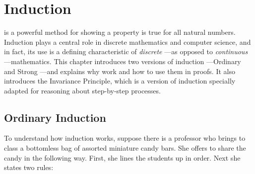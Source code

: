 \chapter{Induction}\label{induction_chap}

 is a powerful method for showing a property is true
for all natural numbers.  Induction plays a central role in discrete
mathematics and computer science, and in fact, its use is a defining
characteristic of \emph{discrete} ---as opposed to \emph{continuous}
---mathematics.  This chapter introduces two versions of induction
---Ordinary and Strong ---and explains why work and how to use them in
proofs.  It also introduces the Invariance Principle, which is a
version of induction specially adapted for reasoning about
step-by-step processes.


\iffalse
we'll introduce induction and a variant called \term{strong
induction}.  Although these two version of methods look and feel
different, it turns out that they are equivalent in the sense that a
proof using any one of the methods can be automatically reformatted so
that it becomes a proof using any of the other methods.  The choice of
which method to use is up to you and typically depends on whichever
seems to be the easiest or most natural for the problem at hand.
\fi


\section{Ordinary Induction}\label{ordinary_induct_chap}

To understand how induction works, suppose there is a professor who
brings to class a bottomless bag of assorted miniature candy bars.
She offers to share the candy in the following way.  First, she lines
the students up in order.  Next she states two rules:

